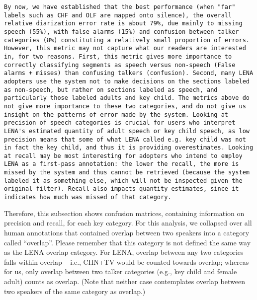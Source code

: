 \documentclass[english,floatsintext,man]{apa6}
\begin{document}
\begin{verbatim}
By now, we have established that the best performance (when "far" labels such as CHF and OLF are mapped onto silence), the overall relative diarization error rate is about 79%, due mainly to missing speech (55%), with false alarms (15%) and confusion between talker categories (8%) constituting a relatively small proportion of errors. However, this metric may not capture what our readers are interested in, for two reasons. First, this metric gives more importance to correctly classifying segments as speech versus non-speech (False alarms + misses) than confusing talkers (confusion). Second, many LENA adopters use the system not to make decisions on the sections labeled as non-speech, but rather on sections labeled as speech, and particularly those labeled adults and key child. The metrics above do not give more importance to these two categories, and do not give us insight on the patterns of error made by the system. Looking at precision of speech categories is crucial for users who interpret LENA's estimated quantity of adult speech or key child speech, as low precision means that some of what LENA called e.g. key child was not in fact the key child, and thus it is providing overestimates. Looking at recall may be most interesting for adopters who intend to employ LENA as a first-pass annotation: the lower the recall, the more is missed by the system and thus cannot be retrieved (because the system labeled it as something else, which will not be inspected given the original filter). Recall also impacts quantity estimates, since it indicates how much was missed of that category.
\end{verbatim}

Therefore, this subsection shows confusion matrices, containing
information on precision and recall, for each key category. For this
analysis, we collapsed over all human annotations that contained overlap
between two speakers into a category called \enquote{overlap}. Please
remember that this category is not defined the same way as the LENA
overlap category. For LENA, overlap between any two categories falls
within overlap -- i.e., CHN+TV would be counted towards overlap; whereas
for us, only overlap between two talker categories (e.g., key child and
female adult) counts as overlap. (Note that neither case contemplates
overlap between two speakers of the same category as overlap.)
\end{document}

